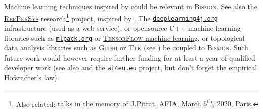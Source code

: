 Machine learning techniques inspired by \cite{zhang:2019:learned}
could be relevant in \textsc{Bismon}. See also the
\href{http://refpersys.org/}{\textsc{RefPerSys}}  research\footnote{Also related:
  \href{https://afia.asso.fr/journee-hommage-j-pitrat/}{talks in the
    memory of J.Pitrat, AFIA, March 6\textsuperscript{th}, 2020,
    Paris.}} project, inspired by \cite{Pitrat:1996:FGCS,
  Pitrat:2009:AST, Pitrat:2009:ArtifBeings,
  Starynkevitch-1990-EUM}. The 
\href{https://deeplearning4j.org/}{\texttt{deeplearning4j.org}}
infrastructure (used as a web service), or opensource C++ machine
learning libraries such as   \href{https://mlpack.org}{\texttt{mlpack.org}}
or \href{https://www.tensorflow.org/}{\textsc{TensorFlow} machine
  learning}, or  topological data analysis libraries such as
\href{https://gudhi.inria.fr/}{\textsc{Gudhi}} or
\href{https://topology-tool-kit.github.io/}{\textsc{Ttk}} (see
\cite{Masood:2019:ttk}) be coupled to \textsc{Bismon}. Such future
work would however require further funding for at least a year of
qualified developer work (see also
\cite{Maglogiannis:2007:emerging-ai-app} and
 the
\href{https://www.ai4eu.eu/}{\texttt{ai4eu.eu}} project, but don't
forget the empirical
\href{https://en.wikipedia.org/wiki/Hofstadter\%27s\_law}{Hofstadter's
  law}).

\medskip

